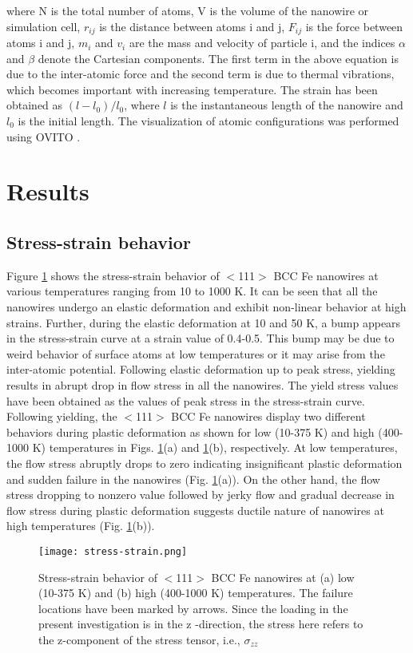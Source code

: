 \documentclass[%
reprint,%
 amssymb, amsmath,%
 aip,apl,%
]{revtex4-1}
\begin{document}
where N is the total number of atoms, V is the volume of the nanowire or simulation cell, $r_{ij}$ is the distance between atoms i 
and j, $F_{ij}$ is the force between atoms i and j, $m_i$ and $v_i$ are the mass and velocity of particle i, and the indices $\alpha$ 
and $\beta$ denote the Cartesian components. The first term in the above equation is due to the inter-atomic force and the second 
term is due to thermal vibrations, which becomes important with increasing temperature. The strain has been obtained as $(l-l_0)/l_0$, 
where $l$ is the instantaneous length of the nanowire and $l_0$ is the initial length. The visualization of atomic configurations was 
performed using OVITO \cite{Ovito}. 

\section{Results}
\subsection{Stress-strain behavior}

Figure \ref{stress-strain} shows the stress-strain behavior of $<$111$>$ BCC Fe nanowires at various temperatures ranging from 10 to
1000 K. It can be seen that all the nanowires undergo an elastic deformation and exhibit non-linear behavior at high strains. Further, 
during the elastic deformation at 10 and 50 K, a bump appears in the stress-strain curve at a strain value of 0.4-0.5. This bump may 
be due to weird behavior of surface atoms at low temperatures or it may arise from the inter-atomic potential. Following elastic 
deformation up to peak stress, yielding results in abrupt drop in flow stress in all the nanowires. The yield stress values have been 
obtained as the values of peak stress in the stress-strain curve. Following yielding, the $<$111$>$ BCC Fe nanowires display two 
different behaviors during plastic deformation as shown for low (10-375 K) and high (400-1000 K) temperatures in Figs. \ref{stress-strain}(a) 
and \ref{stress-strain}(b), respectively. At low temperatures, the flow stress abruptly drops to zero indicating insignificant plastic 
deformation and sudden failure in the nanowires (Fig. \ref{stress-strain}(a)). On the other hand, the flow stress dropping to nonzero 
value followed by jerky flow and gradual decrease in flow stress during plastic deformation suggests ductile nature of nanowires 
at high temperatures (Fig. \ref{stress-strain}(b)). 

\begin{figure}
\centering
\texttt{[image: stress-strain.png]}
\caption { Stress-strain behavior of $<$111$>$ BCC Fe nanowires at (a) low (10-375 K) and (b) high (400-1000 K) 
temperatures. The failure locations have been marked by arrows. Since the loading in the present investigation is in the z -direction, 
the stress here refers to the z-component of the stress tensor, i.e., $\sigma_{zz}$}
\label{stress-strain}
\end{figure}
\end{document}
